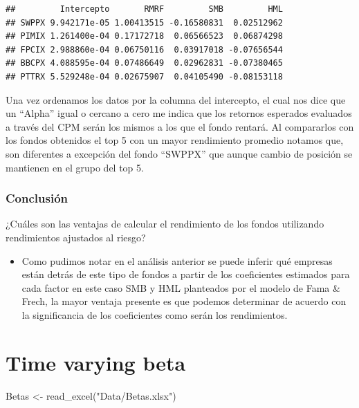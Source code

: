 \documentclass[
  12pt,
]{article}
\newenvironment{Shaded}{\begin{snugshade}}{\end{snugshade}}
\newcommand{\FunctionTok}[1]{\textcolor[rgb]{0.00,0.00,0.00}{#1}}
\newcommand{\NormalTok}[1]{#1}
\newcommand{\OtherTok}[1]{\textcolor[rgb]{0.56,0.35,0.01}{#1}}
\newcommand{\StringTok}[1]{\textcolor[rgb]{0.31,0.60,0.02}{#1}}
\providecommand{\tightlist}{%
  \setlength{\itemsep}{0pt}\setlength{\parskip}{0pt}}
\begin{document}
\begin{verbatim}
##         Intercepto       RMRF         SMB         HML
## SWPPX 9.942171e-05 1.00413515 -0.16580831  0.02512962
## PIMIX 1.261400e-04 0.17172718  0.06566523  0.06874298
## FPCIX 2.988860e-04 0.06750116  0.03917018 -0.07656544
## BBCPX 4.088595e-04 0.07486649  0.02962831 -0.07380465
## PTTRX 5.529248e-04 0.02675907  0.04105490 -0.08153118
\end{verbatim}

Una vez ordenamos los datos por la columna del intercepto, el cual nos
dice que un ``Alpha'' igual o cercano a cero me indica que los retornos
esperados evaluados a través del CPM serán los mismos a los que el fondo
rentará. Al compararlos con los fondos obtenidos el top 5 con un mayor
rendimiento promedio notamos que, son diferentes a excepción del fondo
``SWPPX'' que aunque cambio de posición se mantienen en el grupo del top
5.

\hypertarget{conclusiuxf3n}{%
\subsubsection{Conclusión}\label{conclusiuxf3n}}

¿Cuáles son las ventajas de calcular el rendimiento de los fondos
utilizando rendimientos ajustados al riesgo?

\begin{itemize}
\tightlist
\item
  Como pudimos notar en el análisis anterior se puede inferir qué
  empresas están detrás de este tipo de fondos a partir de los
  coeficientes estimados para cada factor en este caso SMB y HML
  planteados por el modelo de Fama \& Frech, la mayor ventaja presente
  es que podemos determinar de acuerdo con la significancia de los
  coeficientes como serán los rendimientos.
\end{itemize}

\hypertarget{time-varying-beta}{%
\section{Time varying beta}\label{time-varying-beta}}

\begin{Shaded}
\begin{Highlighting}[]
\NormalTok{Betas }\OtherTok{\textless{}{-}} \FunctionTok{read\_excel}\NormalTok{(}\StringTok{"Data/Betas.xlsx"}\NormalTok{)}
\end{Highlighting}
\end{Shaded}
\end{document}
